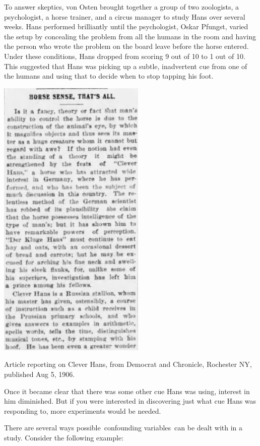 \begin{refsection}
To answer skeptics, von Osten brought together a group of two zoologists, a psychologist, a horse trainer, and a circus manager to study Hans over several weeks. Hans performed brilliantly until the psychologist, Oskar Pfungst, varied the setup by concealing the problem from all the humans in the room and having the person who wrote the problem on the board leave before the horse entered. Under these conditions, Hans dropped from scoring 9 out of 10 to 1 out of 10. This suggested that Hans was picking up a subtle, inadvertent cue from one of the humans and using that to decide when to stop tapping his foot.\begin{marginfigure}
\begin{center}\includegraphics{../images/cleverhansarticle.png}\end{center}
\caption{Article reporting on Clever Hans, from Democrat and Chronicle, Rochester NY, published Aug 5, 1906.}
\label{fig:cleverhansarticle}
\end{marginfigure}

Once it became clear that there was some other cue Hans was using, interest in him diminished. But if you were interested in discovering just what cue Hans was responding to, more experiments would be needed. 

There are several ways possible confounding variables can be dealt with in a study. Consider the following example:


\end{refsection}
